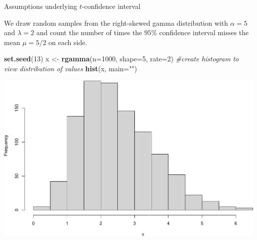 \documentclass[
  ignorenonframetext,
]{beamer}
\newenvironment{Shaded}{\begin{snugshade}}{\end{snugshade}}
\newcommand{\AttributeTok}[1]{\textcolor[rgb]{0.13,0.29,0.53}{#1}}
\newcommand{\CommentTok}[1]{\textcolor[rgb]{0.56,0.35,0.01}{\textit{#1}}}
\newcommand{\DecValTok}[1]{\textcolor[rgb]{0.00,0.00,0.81}{#1}}
\newcommand{\FunctionTok}[1]{\textcolor[rgb]{0.13,0.29,0.53}{\textbf{#1}}}
\newcommand{\NormalTok}[1]{#1}
\newcommand{\OtherTok}[1]{\textcolor[rgb]{0.56,0.35,0.01}{#1}}
\newcommand{\StringTok}[1]{\textcolor[rgb]{0.31,0.60,0.02}{#1}}
\begin{document}
\begin{frame}[fragile]{Assumptions underlying \(t\)-confidence interval}
\protect\hypertarget{assumptions-underlying-t-confidence-interval-2}{}
\begin{tcolorbox}
We draw random samples from the right-skewed gamma distribution with $\alpha=5$ and $\lambda=2$ and count the number of times the $95\%$ confidence interval misses the mean $\mu=5/2$ on each side.
\end{tcolorbox}

\normalsize

\begin{Shaded}
\begin{Highlighting}[]
\FunctionTok{set.seed}\NormalTok{(}\DecValTok{13}\NormalTok{)}
\NormalTok{x }\OtherTok{\textless{}{-}} \FunctionTok{rgamma}\NormalTok{(}\AttributeTok{n=}\DecValTok{1000}\NormalTok{, }\AttributeTok{shape=}\DecValTok{5}\NormalTok{, }\AttributeTok{rate=}\DecValTok{2}\NormalTok{)}
\CommentTok{\#create histogram to view distribution of values}
\FunctionTok{hist}\NormalTok{(x, }\AttributeTok{main=}\StringTok{""}\NormalTok{)}
\end{Highlighting}
\end{Shaded}

\begin{center}\includegraphics[width=0.6\linewidth,height=0.4\textheight]{Week10_Lect_files/figure-beamer/unnamed-chunk-66-1} \end{center}
\normalsize
\end{frame}
\end{document}
